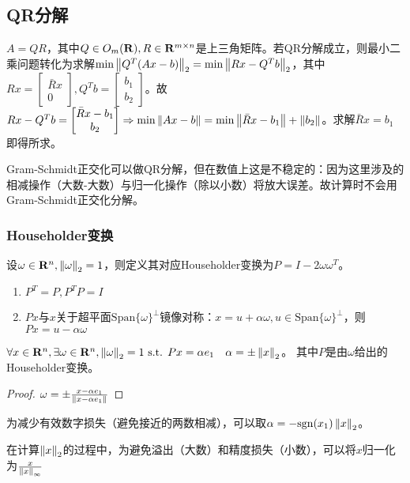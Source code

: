 \documentclass{ctexart}
\begin{document}
\subsection{QR分解}
$A=QR$，其中$Q\in O_m(\mathbf{R}), R\in \mathbf{R}^{m\times n}$是上三角矩阵。若QR分解成立，则最小二乘问题转化为求解$\min\left\|Q^T(Ax-b) \right\|_2=\min\left\|Rx-Q^Tb \right\|_2$，其中$Rx=\begin{bmatrix}\bar Rx\\0\end{bmatrix}, Q^Tb=\begin{bmatrix}b_1\\b_2\end{bmatrix}$。故$Rx-Q^Tb=\begin{bmatrix}\bar Rx-b_1\\ b_2\end{bmatrix}\Rightarrow \min\left\|Ax-b \right\|=\min\left\|\bar{R}x-b_1 \right\|+\left\|b_2 \right\|$。求解$\bar Rx=b_1$即得所求。

Gram-Schmidt正交化可以做QR分解，但在数值上这是不稳定的：因为这里涉及的相减操作（大数-大数）与归一化操作（除以小数）将放大误差。故计算时不会用Gram-Schmidt正交化分解。

\subsubsection{Householder变换}
设$\omega\in \mathbf{R}^n,\left\|\omega \right\|_2=1$，则定义其对应Householder变换为$P=I-2\omega\omega^T$。

\begin{Prop}
\begin{enumerate}
\item $P^T=P,P^TP=I$
\item $Px$与$x$关于超平面$\mathrm{Span}\{\omega\}^\perp$镜像对称：$x=u+\alpha\omega,u\in \mathrm{Span}\{\omega\}^\perp$，则$Px=u-\alpha\omega$
\end{enumerate}
\end{Prop}

\begin{Thm}
$\forall x\in\mathbf{R}^n, \exists \omega\in \mathbf{R}^n,\left\|\omega \right\|_2=1\text{ s.t. } Px=\alpha e_1\quad \alpha=\pm\left\|x \right\|_2$。
其中$P$是由$\omega$给出的Householder变换。
\end{Thm}

\begin{proof}
$\omega=\pm\frac{x-\alpha e_1}{\left\|x-\alpha e_1 \right\|}$
\end{proof}
为减少有效数字损失（避免接近的两数相减），可以取$\alpha=-\mathrm{sgn}(x_1)\left\|x \right\|_2$。

在计算$\left\|x \right\|_2$的过程中，为避免溢出（大数）和精度损失（小数），可以将$x$归一化为$\frac{x}{\left\|x \right\|_\infty}$
\end{document}
